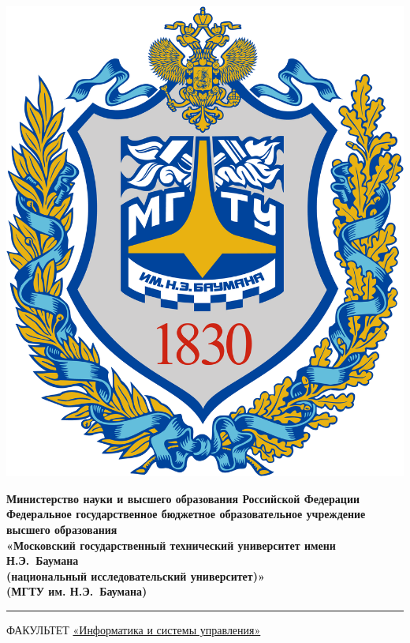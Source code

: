 \documentclass[a4paper,12pt]{article}
\author{Казакова Элиза}
\date{\today}
\begin{document}
	
	\begin{titlepage}
		\fontsize{12pt}{12pt}\selectfont
		\noindent \begin{minipage}{0.15\textwidth}
			\includegraphics[width=\linewidth]{ MGTU.png}
		\end{minipage}
		\noindent\begin{minipage}{0.9\textwidth}\centering
			\textbf{Министерство науки и высшего образования Российской Федерации}\\
			\textbf{Федеральное государственное бюджетное образовательное учреждение высшего образования}\\
			\textbf{«Московский государственный технический университет имени Н.Э.~Баумана}\\
			\textbf{(национальный исследовательский университет)»}\\
			\textbf{(МГТУ им. Н.Э.~Баумана)}
		\end{minipage}
		
		\noindent\rule{18cm}{3pt}
		\newline\newline
		\noindent 
		ФАКУЛЬТЕТ 
		\underline{«Информатика и системы управления»} \newline\newline
		

\end{titlepage}
\end{document}
